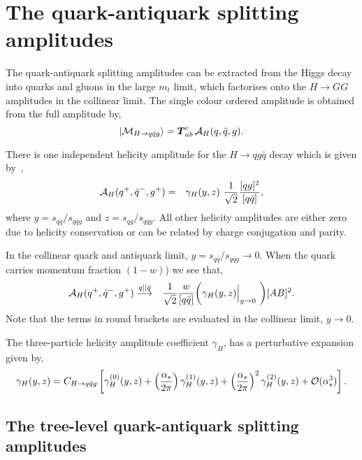 \documentclass[paper,notoc,nohyper]{JHEP3}
\def\bom#1{{\mbox{\boldmath $#1$}}}
\begin{document}
\section{The quark-antiquark splitting amplitudes}
\label{sec:quarkantiquark}

The quark-antiquark
splitting amplitudes can be extracted from
the Higgs decay into quarks and gluons in the large $m_t$ limit, which factorises onto the $H \to GG$ amplitudes in
the collinear limit. 
The single colour ordered amplitude is obtained from the 
full amplitude by,
\begin{equation}
|{\cal M}_{H \to q  \bar q g}\rangle = {\bom T^c_{ab}} \, {\cal A}_H(q,\bar
q,g).
\end{equation}

There 
is one independent helicity amplitude for the $H \to qg\bar q$ decay 
which is given by~\cite{Schmidt:1997wr,inprep},
\begin{eqnarray}
\label{eq:helamphqqg}
{\cal A}_H(q^+,\bar q^-, g^+) &=& \gamma_H(y,z)~\frac{1}{\sqrt{2}}
\frac{[qg]^2}{[q\bar q]},
\end{eqnarray}
where $y = s_{q\bar q}/s_{q\bar qg}$ and $z = s_{qg}/s_{q\bar qg}$.
All other helicity amplitudes are either zero due to helicity conservation 
or can be related by charge conjugation and parity.

In the collinear quark and antiquark limit, $y = s_{q\bar q}/s_{q\bar qg} \to 0$.
When the quark carries momentum fraction $(1-w)$) we see that,
\begin{eqnarray}
{\cal A}_H(q^+,\bar q^-, g^+) &\stackrel{q||\bar q}{\longrightarrow}&
\frac{1}{\sqrt{2}} 
 \frac{w}{[q\bar q]}\biggl( \gamma_H(y,z)\Big|_{y \to 0}~\biggr)[A B]^2.
\end{eqnarray}
Note that the terms in round brackets are evaluated in the collinear limit, $y \to 0$.

The three-particle helicity amplitude coefficient $\gamma_H$,
has a perturbative expansion 
given by, 
\begin{equation}
\gamma_H(y,z) =  C_{H \to q\bar q g} \left[
\gamma_H^{(0)}(y,z)  
+ \left(\frac{\alpha_s}{2\pi}\right) \gamma_H^{(1)}(y,z)  
+ \left(\frac{\alpha_s}{2\pi}\right)^2 \gamma_H^{(2)}(y,z) 
+ {\cal O}(\alpha_s^3) \right] .
\end{equation}

\subsection{The tree-level quark-antiquark splitting amplitudes}
\end{document}

